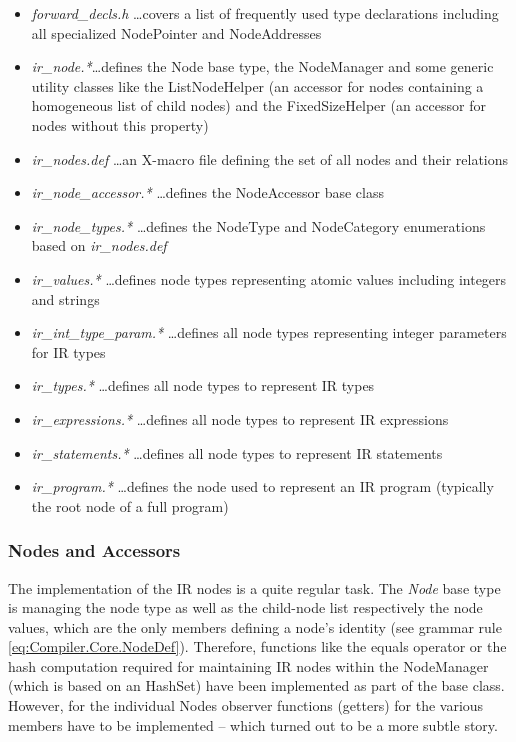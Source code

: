 \begin{itemize}
  \item \textit{forward\_decls.h} \ldots covers a list of frequently used type
  declarations including all specialized NodePointer and NodeAddresses
  \item \textit{ir\_node.*}\ldots defines the Node base type, the NodeManager
  and some generic utility classes like the ListNodeHelper (an accessor for
  nodes containing a homogeneous list of child nodes) and the FixedSizeHelper
  (an accessor for nodes without this property)
  \item \textit{ir\_nodes.def} \ldots an X-macro file defining the set of all
  nodes and their relations
  \item \textit{ir\_node\_accessor.*} \dots defines the NodeAccessor base class
  \item \textit{ir\_node\_types.*} \ldots defines the NodeType and NodeCategory
  enumerations based on \textit{ir\_nodes.def}
  \item \textit{ir\_values.*} \dots defines node types representing atomic
  values including integers and strings
  \item \textit{ir\_int\_type\_param.*} \ldots defines all node types
  representing integer parameters for IR types
  \item \textit{ir\_types.*} \ldots defines all node types to represent IR types
  \item \textit{ir\_expressions.*} \ldots defines all node types to represent IR
  expressions
  \item \textit{ir\_statements.*} \ldots defines all node types to represent IR
  statements
  \item \textit{ir\_program.*} \ldots defines the node used to represent an IR
  program (typically the root node of a full program)
\end{itemize}


\subsubsection{Nodes and Accessors} 
The implementation of the IR nodes is a quite regular task. The \textit{Node}
base type is managing the node type as well as the child-node list respectively
the node values, which are the only members defining a node's identity (see
grammar rule \ref{eq:Compiler.Core.NodeDef}). Therefore, functions like the
equals operator or the hash computation required for maintaining IR nodes
within the NodeManager (which is based on an HashSet) have been implemented
as part of the base class. However, for the individual Nodes observer functions
(getters) for the various members have to be implemented -- which turned out to
be a more subtle story.

